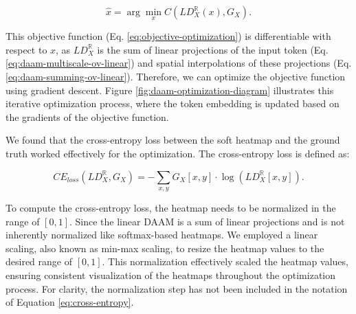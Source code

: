 \begin{equation}
\label{eq:objective-optimization}
    \hat{x} = \arg\min_{x} C \left ( {LD}_X^{\mathbb{R}}\left ( x \right ), G_X \right ) .
\end{equation}

This objective function (Eq. \ref{eq:objective-optimization}) is differentiable with respect to $x$, as ${LD}_X^{\mathbb{R}}$ is the sum of linear projections of the input token (Eq. \ref{eq:daam-multiscale-ov-linear}) and spatial interpolations of these projections (Eq. \ref{eq:daam-summing-ov-linear}). Therefore, we can optimize the objective function using gradient descent. Figure \ref{fig:daam-optimization-diagram} illustrates this iterative optimization process, where the token embedding is updated based on the gradients of the objective function.

We found that the cross-entropy loss between the soft heatmap and the ground truth worked effectively for the optimization. The cross-entropy loss is defined as:


\begin{equation}
\label{eq:cross-entropy}
    CE_{loss} \left ({LD}_X^{\mathbb{R}}, G_X \right ) = - \sum_{x, y} G_X [x, y]\cdot \log \left ( {LD}^{\mathbb{R}}_X [x, y] \right ) .
\end{equation}

To compute the cross-entropy loss, the heatmap needs to be normalized in the range of $[0, 1]$. Since the linear DAAM is a sum of linear projections and is not inherently normalized like softmax-based heatmaps. We employed a linear scaling, also known as min-max scaling, to resize the heatmap values to the desired range of $[0, 1]$. This normalization effectively scaled the heatmap values, ensuring consistent visualization of the heatmaps throughout the optimization process. For clarity, the normalization step has not been included in the notation of Equation \ref{eq:cross-entropy}.

